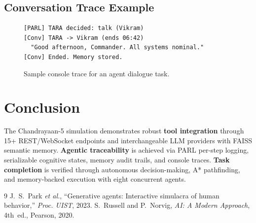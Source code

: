 \documentclass[10pt,conference]{IEEEtran}
\begin{document}
\subsection{Conversation Trace Example}

\begin{figure}[ht]
\begin{lstlisting}[language={}]
[PARL] TARA decided: talk (Vikram)
[Conv] TARA -> Vikram (ends 06:42)
  "Good afternoon, Commander. All systems nominal."
[Conv] Ended. Memory stored.
\end{lstlisting}
\vspace{-4pt}
\caption{Sample console trace for an agent dialogue task.}
\label{fig:code_trace}
\end{figure}

\section{Conclusion}

The Chandrayaan-5 simulation demonstrates robust \textbf{tool integration} through 15+ REST/WebSocket endpoints and interchangeable LLM providers with FAISS semantic memory. \textbf{Agentic traceability} is achieved via PARL per-step logging, serializable cognitive states, memory audit trails, and console traces. \textbf{Task completion} is verified through autonomous decision-making, A* pathfinding, and memory-backed execution with eight concurrent agents.


\begin{thebibliography}{9}\itemsep=0pt\parskip=0pt
J.~S.~Park \textit{et al.}, ``Generative agents: Interactive simulacra of human behavior,'' \textit{Proc. UIST}, 2023.
S.~Russell and P.~Norvig, \textit{AI: A Modern Approach}, 4th~ed., Pearson, 2020.
\end{thebibliography}
\end{document}
